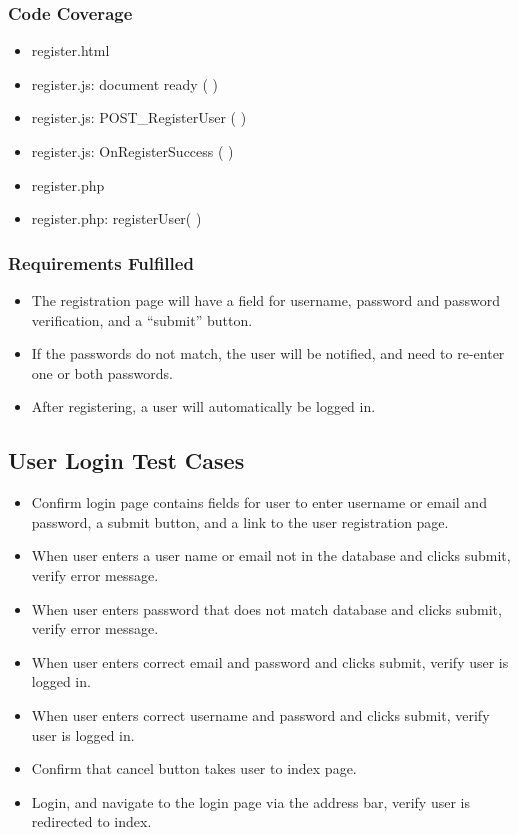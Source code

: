 \subsubsection{Code Coverage}
\begin{itemize}
\item register.html
\item register.js: document ready ( )
\item register.js: POST\_RegisterUser ( )
\item register.js: OnRegisterSuccess ( )
\item register.php 
\item register.php: registerUser( )
\end{itemize}
\subsubsection{Requirements Fulfilled}
\begin{itemize}
\item The registration page will have a field for username, password and password verification, and a ``submit'' button.
\item If the passwords do not match, the user will be notified, and need to re-enter one or both passwords.
\item After registering, a user will automatically be logged in.
\end{itemize}

\subsection{User Login Test Cases}
\begin{itemize}
\item Confirm login page contains fields for user to enter username or email and password, a submit button, and a link to the user registration page.
\item When user enters a user name or email not in the database and clicks submit, verify error message.
\item When user enters password that does not match database and clicks submit, verify error message.
\item When user enters correct email and password and clicks submit, verify user is logged in.
\item When user enters correct username and password and clicks submit, verify user is logged in.
\item Confirm that cancel button takes user to index page.
\item Login, and navigate to the login page via the address bar, verify user is redirected to index.
\end{itemize}
